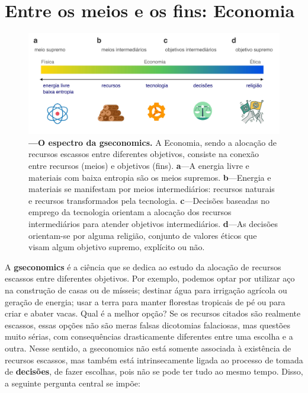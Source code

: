 \documentclass[./main.tex]{subfiles}
\begin{document}
\section{Entre os meios e os fins: Economia} \label{chap:ecoeco:economy}

\begin{figure}[t!] 
\centering				
\includegraphics[width=0.98\linewidth]{figs/fig_economics.jpg}		
\caption[O espectro da Economia]
{\textbf{---\;O espectro da \gls{gseconomics}.}
    A Economia, sendo a alocação de recursos escassos entre diferentes objetivos, consiste na conexão entre recursos (meios) e objetivos (fins). \;\textbf{a}\;---\;A energia livre e materiais com baixa entropia são os meios supremos.
    \;\textbf{b}\;---\;Energia e materiais se manifestam por meios intermediários: recursos naturais e recursos transformados pela tecnologia.
    \;\textbf{c}\;---\;Decisões baseadas no emprego da tecnologia orientam a alocação dos recursos intermediários para atender objetivos intermediários.
    \;\textbf{d}\;---\;As decisões orientam-se por alguma religião, conjunto de valores éticos que visam algum objetivo supremo, explícito ou não.}
\label{fig:eco:economics} 		
\end{figure}

\par A \textbf{\gls{gseconomics}} é a ciência que se dedica ao estudo da alocação de recursos escassos entre diferentes objetivos. Por exemplo, podemos optar por utilizar aço na construção de casas ou de mísseis; destinar água para irrigação agrícola ou geração de energia; usar a terra para manter florestas tropicais de pé ou para criar e abater vacas. Qual é a melhor opção? Se os recursos citados são realmente escassos, essas opções não são meras falsas dicotomias falaciosas, mas questões muito sérias, com consequências drasticamente diferentes entre uma escolha e a outra. Nesse sentido, a \gls{gseconomics} não está somente associada à existência de recursos escassos, mas também está intrinsecamente ligada ao processo de tomada de \textbf{decisões}, de fazer escolhas, pois não se pode ter tudo ao mesmo tempo. Disso, a seguinte pergunta central se impõe:
\end{document}
